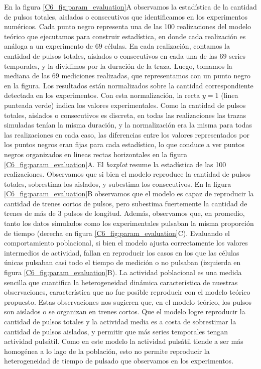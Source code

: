 \documentclass[./main.tex]{subfiles}
\begin{document}
En la figura \ref{C6_fig:param_evaluation}A observamos la estadística de la cantidad de pulsos totales, aislados o consecutivos que identificamos en los experimentos numéricos. Cada punto negro representa una de las 100 realizaciones del modelo teórico que ejecutamos para construir estadística, en donde cada realización es análoga a un experimento de $69$ células. En cada realización, contamos la cantidad de pulsos totales, aislados o consecutivos en cada una de las $69$ series temporales, y la dividimos por la duración de la traza. Luego, tomamos la mediana de las $69$ mediciones realizadas, que representamos con un punto negro en la figura. Los resultados están normalizados sobre la cantidad correspondiente detectada en los experimentos. Con esta normalización, la recta $y = 1$ (linea punteada verde) indica los valores experimentales. Como la cantidad de pulsos totales, aislados o consecutivos es discreta, en todas las realizaciones las trazas simuladas tenían la misma duración, y la normalización era la misma para todas las realizaciones en cada caso, las diferencias entre los valores representados por los puntos negros eran fijas para cada estadístico, lo que conduce a ver puntos negros organizados en lineas rectas horizontales en la figura \ref{C6_fig:param_evaluation}A. El \textit{boxplot} resume la estadística de las 100 realizaciones. Observamos que si bien el modelo reproduce la cantidad de pulsos totales, sobrestima los aislados, y subestima los consecutivos. En la figura \ref{C6_fig:param_evaluation}B observamos que el modelo es capaz de reproducir la cantidad de trenes cortos de pulsos, pero subestima fuertemente la cantidad de trenes de más de $3$ pulsos de longitud. Además, observamos que, en promedio, tanto los datos simulados como los experimentales pulsaban la misma proporción de tiempo (derecha en figura \ref{C6_fig:param_evaluation}C). Evaluando el comportamiento poblacional, si bien el modelo ajusta correctamente los valores intermedios de actividad, fallan en reproducir los casos en los que las células únicas pulsaban casi todo el tiempo de medición o no pulsaban (izquierda en figura \ref{C6_fig:param_evaluation}B). La actividad poblacional es una medida sencilla que cuantifica la heterogeneidad dinámica característica de nuestras observaciones, característica que no fue posible reproducir con el modelo teórico propuesto. Estas observaciones nos sugieren que, en el modelo teórico, los pulsos son aislados o se organizan en trenes cortos. Que el modelo logre reproducir la cantidad de pulsos totales y la actividad media es a costa de sobrestimar la cantidad de pulsos aislados, y permitir que más series temporales tengan actividad pulsátil. Como en este modelo la actividad pulsátil tiende a ser más homogénea a lo lago de la población, esto no permite reproducir la heterogeneidad de tiempo de pulsado que observamos en los experimentos. 
\end{document}
